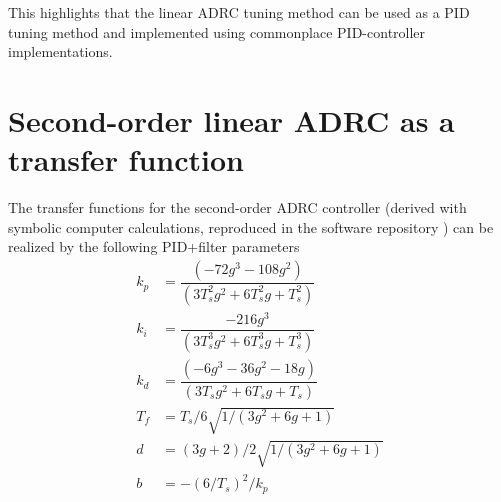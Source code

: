 \documentclass[letterpaper, 10 pt, conference]{ieeeconf}
\begin{document}
This highlights that the linear ADRC tuning method can be used as a PID tuning method and implemented using commonplace PID-controller implementations.





\appendix

\section{Second-order linear ADRC as a transfer function}
The transfer functions for the second-order ADRC controller (derived with symbolic computer calculations, reproduced in the software repository \cite{repo}) can be realized by the following PID+filter parameters
\begin{align}
	k_p &= \dfrac{(-72g^3 - 108g^2)}{(3T_s^2 g^2 + 6T_s^2 g + T_s^2)} \\
	k_i &= \dfrac{-216g^3}{(3T_s^3 g^2 + 6T_s^3 g + T_s^3)} \\
	k_d &= \dfrac{(-6g^3 - 36g^2 - 18g)}{(3T_s g^2 + 6T_s g + T_s)} \\
	T_f &= T_s/6 \sqrt{1/(3g^2 + 6g + 1)} \\
	d &= (3g + 2)/2 \sqrt{1/(3g^2 + 6g + 1)} \\
	b &= -(6/T_s)^2 / k_p
\end{align}
\end{document}
